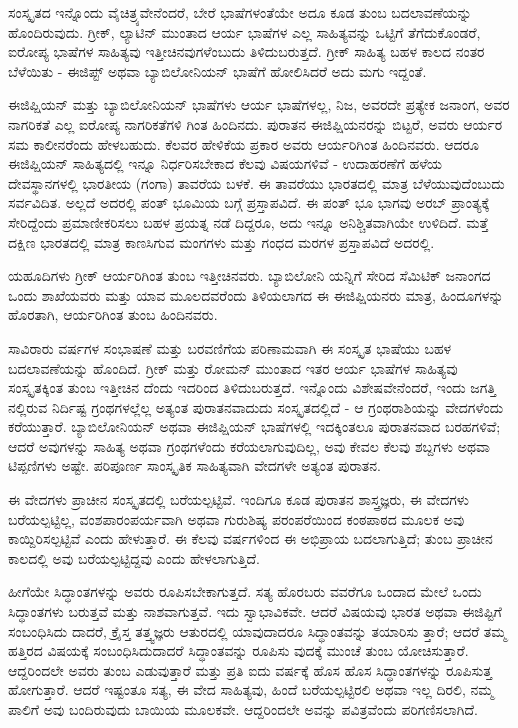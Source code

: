 ಸಂಸ್ಕೃತದ ಇನ್ನೊಂದು ವೈಚಿತ್ರ್ಯವೇನೆಂದರೆ, ಬೇರೆ ಭಾಷೆಗಳಂತೆಯೇ ಅದೂ ಕೂಡ ತುಂಬ ಬದಲಾವಣೆಯನ್ನು ಹೊಂದಿರುವುದು. ಗ್ರೀಕ್, ಲ್ಯಾಟಿನ್ ಮುಂತಾದ ಆರ್ಯ ಭಾಷೆಗಳ ಎಲ್ಲ ಸಾಹಿತ್ಯವನ್ನು ಒಟ್ಟಿಗೆ ತೆಗೆದುಕೊಂಡರೆ, ಐರೋಪ್ಯ ಭಾಷೆಗಳ ಸಾಹಿತ್ಯವು ಇತ್ತೀಚಿನವುಗಳೆಂಬುದು ತಿಳಿದುಬರುತ್ತದೆ. ಗ್ರೀಕ್ ಸಾಹಿತ್ಯ ಬಹಳ ಕಾಲದ ನಂತರ ಬೆಳೆಯಿತು - ಈಜಿಪ್ಟ್ ಅಥವಾ ಬ್ಯಾಬಿಲೋನಿಯನ್ ಭಾಷೆಗೆ ಹೋಲಿಸಿದರೆ ಅದು ಮಗು ಇದ್ದಂತೆ.

ಈಜಿಪ್ಷಿಯನ್ ಮತ್ತು ಬ್ಯಾಬಿಲೋನಿಯನ್ ಭಾಷೆಗಳು ಆರ್ಯ ಭಾಷೆಗಳಲ್ಲ, ನಿಜ, ಅವರದೇ ಪ್ರತ್ಯೇಕ ಜನಾಂಗ, ಅವರ ನಾಗರಿಕತೆ ಎಲ್ಲ ಐರೋಪ್ಯ ನಾಗರಿಕತೆಗಳಿ ಗಿಂತ ಹಿಂದಿನದು. ಪುರಾತನ ಈಜಿಪ್ಷಿಯನರನ್ನು ಬಿಟ್ಟರೆ, ಅವರು ಆರ್ಯರ ಸಮ ಕಾಲೀನರೆಂದು ಹೇಳಬಹುದು. ಕೆಲವರ ಹೇಳಿಕೆಯ ಪ್ರಕಾರ ಅವರು ಆರ್ಯರಿಗಿಂತ ಹಿಂದಿನವರು. ಆದರೂ ಈಜಿಪ್ಷಿಯನ್ ಸಾಹಿತ್ಯದಲ್ಲಿ ಇನ್ನೂ ನಿರ್ಧರಿಸಬೇಕಾದ ಕೆಲವು ವಿಷಯಗಳಿವೆ - ಉದಾಹರಣೆಗೆ ಹಳೆಯ ದೇವಸ್ಥಾನಗಳಲ್ಲಿ ಭಾರತೀಯ (ಗಂಗಾ) ತಾವರೆಯ ಬಳಕೆ. ಈ ತಾವರೆಯು ಭಾರತದಲ್ಲಿ ಮಾತ್ರ ಬೆಳೆಯುವುದೆಂಬುದು ಸರ್ವವಿದಿತ. ಅಲ್ಲದೆ ಅದರಲ್ಲಿ ಪಂತ್ ಭೂಮಿಯ ಬಗ್ಗೆ ಪ್ರಸ್ತಾಪವಿದೆ. ಈ ಪಂತ್ ಭೂ ಭಾಗವು ಅರಬ್ ಪ್ರಾಂತ್ಯಕ್ಕೆ ಸೇರಿದ್ದೆಂದು ಪ್ರಮಾಣೀಕರಿಸಲು ಬಹಳ ಪ್ರಯತ್ನ ನಡೆ ದಿದ್ದರೂ, ಅದು ಇನ್ನೂ ಅನಿಶ್ಚಿತವಾಗಿಯೇ ಉಳಿದಿದೆ. ಮತ್ತೆ ದಕ್ಷಿಣ ಭಾರತದಲ್ಲಿ ಮಾತ್ರ ಕಾಣಸಿಗುವ ಮಂಗಗಳು ಮತ್ತು ಗಂಧದ ಮರಗಳ ಪ್ರಸ್ತಾಪವಿದೆ ಅದರಲ್ಲಿ.

ಯಹೂದಿಗಳು ಗ್ರೀಕ್ ಆರ್ಯರಿಗಿಂತ ತುಂಬ ಇತ್ತೀಚಿನವರು. ಬ್ಯಾಬಿಲೋನಿ ಯನ್ನಿಗೆ ಸೇರಿದ ಸೆಮಿಟಿಕ್ ಜನಾಂಗದ ಒಂದು ಶಾಖೆಯವರು ಮತ್ತು ಯಾವ ಮೂಲದವರೆಂದು ತಿಳಿಯಲಾಗದ ಈ ಈಜಿಪ್ಷಿಯನರು ಮಾತ್ರ, ಹಿಂದೂಗಳನ್ನು ಹೊರತಾಗಿ, ಆರ್ಯರಿಗಿಂತ ತುಂಬ ಹಿಂದಿನವರು.

ಸಾವಿರಾರು ವರ್ಷಗಳ ಸಂಭಾಷಣೆ ಮತ್ತು ಬರವಣಿಗೆಯ ಪರಿಣಾಮವಾಗಿ ಈ ಸಂಸ್ಕೃತ ಭಾಷೆಯು ಬಹಳ ಬದಲಾವಣೆಯನ್ನು ಹೊಂದಿದೆ. ಗ್ರೀಕ್ ಮತ್ತು ರೋಮನ್ ಮುಂತಾದ ಇತರ ಆರ್ಯ ಭಾಷೆಗಳ ಸಾಹಿತ್ಯವು ಸಂಸ್ಕೃತಕ್ಕಿಂತ ತುಂಬ ಇತ್ತೀಚಿನ ದೆಂದು ಇದರಿಂದ ತಿಳಿದುಬರುತ್ತದೆ. ಇನ್ನೊಂದು ವಿಶೇಷವೇನೆಂದರೆ, ಇಂದು ಜಗತ್ತಿ ನಲ್ಲಿರುವ ನಿರ್ದಿಷ್ಟ ಗ್ರಂಥಗಳಲ್ಲೆಲ್ಲ ಅತ್ಯಂತ ಪುರಾತನವಾದುದು ಸಂಸ್ಕೃತದಲ್ಲಿದೆ - ಆ ಗ್ರಂಥರಾಶಿಯನ್ನು ವೇದಗಳೆಂದು ಕರೆಯುತ್ತಾರೆ. ಬ್ಯಾಬಿಲೋನಿಯನ್ ಅಥವಾ ಈಜಿಪ್ಷಿಯನ್ ಭಾಷೆಗಳಲ್ಲಿ ಇದಕ್ಕಿಂತಲೂ ಪುರಾತನವಾದ ಬರಹಗಳಿವೆ; ಆದರೆ ಅವುಗಳನ್ನು ಸಾಹಿತ್ಯ ಅಥವಾ ಗ್ರಂಥಗಳೆಂದು ಕರೆಯಲಾಗುವುದಿಲ್ಲ, ಅವು ಕೇವಲ ಕೆಲವು ಶಬ್ದಗಳು ಅಥವಾ ಟಿಪ್ಪಣಿಗಳು ಅಷ್ಟೇ. ಪರಿಪೂರ್ಣ ಸಾಂಸ್ಕೃತಿಕ ಸಾಹಿತ್ಯವಾಗಿ ವೇದಗಳೇ ಅತ್ಯಂತ ಪುರಾತನ.

ಈ ವೇದಗಳು ಪ್ರಾಚೀನ ಸಂಸ್ಕೃತದಲ್ಲಿ ಬರೆಯಲ್ಪಟ್ಟಿವೆ. ಇಂದಿಗೂ ಕೂಡ ಪುರಾತನ ಶಾಸ್ತ್ರಜ್ಞರು, ಈ ವೇದಗಳು ಬರೆಯಲ್ಪಟ್ಟಿಲ್ಲ, ವಂಶಪಾರಂಪರ್ಯವಾಗಿ ಅಥವಾ ಗುರುಶಿಷ್ಯ ಪರಂಪರೆಯಿಂದ ಕಂಠಪಾಠದ ಮೂಲಕ ಅವು ಕಾಯ್ದಿರಿಸಲ್ಪಟ್ಟಿವೆ ಎಂದು ಹೇಳುತ್ತಾರೆ. ಈ ಕೆಲವು ವರ್ಷಗಳಿಂದ ಈ ಅಭಿಪ್ರಾಯ ಬದಲಾಗುತ್ತಿದೆ; ತುಂಬ ಪ್ರಾಚೀನ ಕಾಲದಲ್ಲಿ ಅವು ಬರೆಯಲ್ಪಟ್ಟಿದ್ದವು ಎಂದು ಹೇಳಲಾಗುತ್ತಿದೆ.

ಹೀಗೆಯೇ ಸಿದ್ಧಾಂತಗಳನ್ನು ಅವರು ರೂಪಿಸಬೇಕಾಗುತ್ತದೆ. ಸತ್ಯ ಹೊರಬರು ವವರೆಗೂ ಒಂದಾದ ಮೇಲೆ ಒಂದು ಸಿದ್ಧಾಂತಗಳು ಬರುತ್ತವೆ ಮತ್ತು ನಾಶವಾಗುತ್ತವೆ. ಇದು ಸ್ವಾಭಾವಿಕವೇ. ಆದರೆ ವಿಷಯವು ಭಾರತ ಅಥವಾ ಈಜಿಪ್ಟಿಗೆ ಸಂಬಂಧಿಸಿದು ದಾದರೆ, ಕ್ರೈಸ್ತ ತತ್ತ್ವಜ್ಞರು ಆತುರದಲ್ಲಿ ಯಾವುದಾದರೂ ಸಿದ್ಧಾಂತವನ್ನು ತಯಾರಿಸು ತ್ತಾರೆ; ಆದರೆ ತಮ್ಮ ಹತ್ತಿರದ ವಿಷಯಕ್ಕೆ ಸಂಬಂಧಿಸಿದುದಾದರೆ ಸಿದ್ಧಾಂತವನ್ನು ರೂಪಿಸು ವುದಕ್ಕೆ ಮುಂಚೆ ತುಂಬ ಯೋಚಿಸುತ್ತಾರೆ. ಆದ್ದರಿಂದಲೇ ಅವರು ತುಂಬ ಎಡುವುತ್ತಾರೆ ಮತ್ತು ಪ್ರತಿ ಐದು ವರ್ಷಕ್ಕೆ ಹೊಸ ಹೊಸ ಸಿದ್ಧಾಂತಗಳನ್ನು ರೂಪಿಸುತ್ತ ಹೋಗುತ್ತಾರೆ. ಆದರೆ ಇಷ್ಟಂತೂ ಸತ್ಯ, ಈ ವೇದ ಸಾಹಿತ್ಯವು, ಹಿಂದೆ ಬರೆಯಲ್ಪಟ್ಟಿರಲಿ ಅಥವಾ ಇಲ್ಲ ದಿರಲಿ, ನಮ್ಮ ಪಾಲಿಗೆ ಅವು ಬಂದಿರುವುದು ಬಾಯಿಯ ಮೂಲಕವೇ. ಆದ್ದರಿಂದಲೇ ಅವನ್ನು ಪವಿತ್ರವೆಂದು ಪರಿಗಣಿಸಲಾಗಿದೆ.

